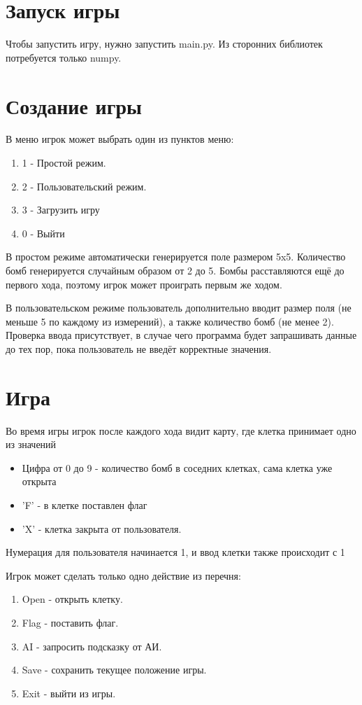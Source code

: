\documentclass[a4paper,14pt, unknownkeysallowed]{extreport}
\begin{document}
\tableofcontents

\chapter{Запуск игры}
Чтобы запустить игру, нужно запустить main.py. 
Из сторонних библиотек потребуется только numpy.

\chapter{Создание игры}
В меню игрок может выбрать один из пунктов меню:
\begin{enumerate}
	\item 1 - Простой режим.
	\item 2 - Пользовательский режим.
	\item 3 - Загрузить игру
	\item 0 - Выйти
\end{enumerate}

В простом режиме автоматически генерируется поле размером 5x5.
Количество бомб генерируется случайным образом от 2 до 5.
Бомбы расставляются ещё до первого хода, поэтому игрок может проиграть первым же ходом.

В пользовательском режиме пользователь дополнительно вводит размер поля (не меньше 5 по каждому из измерений), а также количество бомб (не менее 2).
Проверка ввода присутствует, в случае чего программа будет запрашивать данные до тех пор, пока пользователь не введёт корректные значения.

\chapter{Игра}
Во время игры игрок после каждого хода видит карту, где клетка принимает одно из значений
\begin{itemize}
	\item Цифра от 0 до 9 - количество бомб в соседних клетках, сама клетка уже открыта
	\item 'F' - в клетке поставлен флаг
	\item 'X' - клетка закрыта от пользователя.
\end{itemize}

Нумерация для пользователя начинается 1, и ввод клетки также происходит с 1

Игрок может сделать только одно действие из перечня:
\begin{enumerate}
	\item Open - открыть клетку.
	\item Flag - поставить флаг.
	\item AI - запросить подсказку от АИ.
	\item Save - сохранить текущее положение игры.
	\item Exit - выйти из игры.
\end{enumerate}
\end{document}
